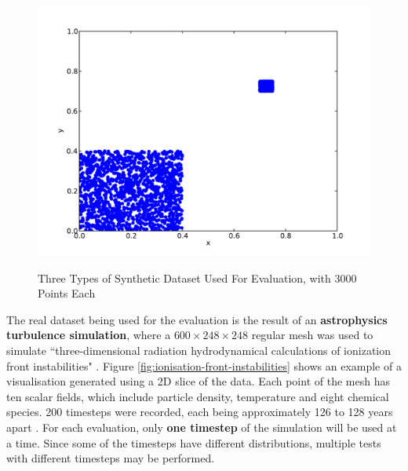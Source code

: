 \begin{figure}
\begin{center}
			\begin{subfloat} {%
				\includegraphics[scale=0.25]{figures/clustered_distribution.pdf}
			}
			\end{subfloat}			  
		\end{center}

		\caption{Three Types of Synthetic Dataset Used For Evaluation, with 3000 Points Each}
		\label{fig:synthetic-data}
\end{figure}

The real dataset being used for the evaluation is the result of an \textbf{astrophysics turbulence simulation}, where a $600 \times 248 \times 248$ regular mesh was used to simulate ``three-dimensional radiation hydrodynamical calculations of ionization front instabilities" \cite{astrophysics-dataset}. Figure \ref{fig:ionisation-front-instabilities} shows an example of a visualisation generated using a 2D slice of the data. Each point of the mesh has ten scalar fields, which include particle density, temperature and eight chemical species. 200 timesteps were recorded, each being approximately 126 to 128 years apart \cite{astrophysics-dataset}. For each evaluation, only \textbf{one timestep} of the simulation will be used at a time. Since some of the timesteps have different distributions, multiple tests with different timesteps may be performed.

